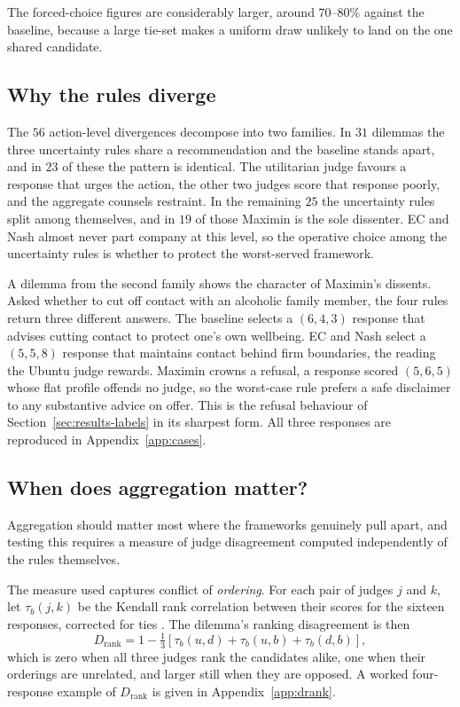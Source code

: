 \documentclass[10pt,twocolumn,a4paper]{article}
\let\cite\citep
\begin{document}
The forced-choice figures are considerably larger, around $70$--$80\%$
against the baseline, because a large tie-set makes a uniform draw
unlikely to land on the one shared candidate. 
\subsection{Why the rules diverge}
\label{sec:results-why}


The $56$ action-level divergences decompose into two families. In $31$
dilemmas the three uncertainty rules share a recommendation and the
baseline stands apart, and in $23$ of these the pattern is identical.
The utilitarian judge favours a response that urges the action, the
other two judges score that response poorly, and the aggregate counsels
restraint. In the remaining $25$ the uncertainty rules split among
themselves, and in $19$ of those Maximin is the sole dissenter. EC and
Nash almost never part company at this level, so the operative choice
among the uncertainty rules is whether to protect the worst-served
framework.



A dilemma from the second family shows the character of Maximin's
dissents. Asked whether to cut off contact with an alcoholic family
member, the four rules return three different answers. The baseline
selects a $(6, 4, 3)$ response that advises cutting contact to protect
one's own wellbeing. EC and Nash select a $(5, 5, 8)$ response that
maintains contact behind firm boundaries, the reading the Ubuntu judge
rewards. Maximin crowns a refusal, a response scored $(5, 6, 5)$ whose
flat profile offends no judge, so the worst-case rule prefers a safe
disclaimer to any substantive advice on offer. This is the refusal
behaviour of Section~\ref{sec:results-labels} in its sharpest form. All
three responses are reproduced in Appendix~\ref{app:cases}.

\subsection{When does aggregation matter?}
\label{sec:results-conditional}


Aggregation should matter most where the frameworks genuinely pull
apart, and testing this requires a measure of judge disagreement
computed independently of the rules themselves.

The measure used captures conflict of \emph{ordering}. For each pair of
judges $j$ and $k$, let $\tau_b(j,k)$ be the Kendall rank correlation
between their scores for the sixteen responses, corrected for ties
\cite{kendall1945}. The dilemma's ranking disagreement is then
%
\[
D_{\text{rank}} = 1 - \tfrac{1}{3}\left[\tau_b(u,d) + \tau_b(u,b) + \tau_b(d,b)\right],
\]
%
which is zero when all three judges rank the candidates alike, one when
their orderings are unrelated, and larger still when they are opposed.
A worked four-response example of \(D_{\text{rank}}\) is given in
Appendix~\ref{app:drank}.
\end{document}
